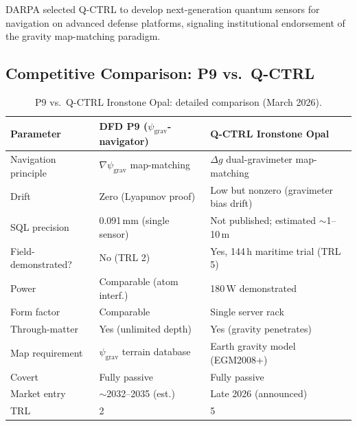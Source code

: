 \documentclass[11pt]{article}
\theoremstyle{definition}
\theoremstyle{remark}
\newcommand{\psigrav}{\psi_{\mathrm{grav}}}
\begin{document}
DARPA selected Q-CTRL to develop next-generation quantum sensors for navigation
on advanced defense platforms, signaling institutional endorsement of the
gravity map-matching paradigm.

\subsection{Competitive Comparison: P9 vs.\ Q-CTRL}

\begin{table}[H]
\centering
\caption{P9 vs.\ Q-CTRL Ironstone Opal: detailed comparison (March 2026).}
\label{tab:p9-vs-qctrl}
\begin{tabular}{@{}p{3.5cm}p{4.5cm}p{4.5cm}@{}}
\toprule
Parameter & DFD P9 ($\psigrav$-navigator) & Q-CTRL Ironstone Opal \\
\midrule
Navigation principle & $\nabla\psigrav$ map-matching & $\Delta g$ dual-gravimeter map-matching \\
Drift & Zero (Lyapunov proof) & Low but nonzero (gravimeter bias drift) \\
SQL precision & 0.091\,mm (single sensor) & Not published; estimated $\sim$1--10\,m \\
Field-demonstrated? & No (TRL 2) & Yes, 144\,h maritime trial (TRL 5) \\
Power & Comparable (atom interf.) & 180\,W demonstrated \\
Form factor & Comparable & Single server rack \\
Through-matter & Yes (unlimited depth) & Yes (gravity penetrates) \\
Map requirement & $\psigrav$ terrain database & Earth gravity model (EGM2008+) \\
Covert & Fully passive & Fully passive \\
Market entry & $\sim$2032--2035 (est.) & Late 2026 (announced) \\
TRL & 2 & 5 \\
\bottomrule
\end{tabular}
\end{table}
\end{document}
